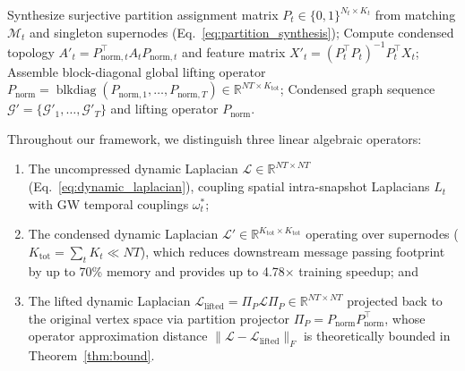 \documentclass[sigconf]{acmart}
\begin{document}
\begin{algorithm}[t]
\begin{algorithmic}[1]
    \STATE Synthesize surjective partition assignment matrix $P_t \in \{0, 1\}^{N_t \times K_t}$ from matching $\mathcal{M}_t$ and singleton supernodes (Eq.~\eqref{eq:partition_synthesis});
    \STATE Compute condensed topology $A'_t = P_{\text{norm}, t}^\top A_t P_{\text{norm}, t}$ and feature matrix $X'_t = (P_t^\top P_t)^{-1} P_t^\top X_t$;
\ENDFOR
\STATE Assemble block-diagonal global lifting operator $P_{\text{norm}} = \operatorname{blkdiag}(P_{\text{norm}, 1}, \dots, P_{\text{norm}, T}) \in \mathbb{R}^{NT \times K_{\text{tot}}}$;
\STATE \RETURN Condensed graph sequence $\mathcal{G}' = \{\mathcal{G}'_1, \dots, \mathcal{G}'_T\}$ and lifting operator $P_{\text{norm}}$.
\end{algorithmic}
\end{algorithm}

Throughout our framework, we distinguish three linear algebraic operators:
\begin{enumerate}
    \item The uncompressed dynamic Laplacian $\mathcal{L} \in \mathbb{R}^{NT \times NT}$ (Eq.~\eqref{eq:dynamic_laplacian}), coupling spatial intra-snapshot Laplacians $L_t$ with GW temporal couplings $\omega_t^*$;
    \item The condensed dynamic Laplacian $\mathcal{L}' \in \mathbb{R}^{K_{\text{tot}} \times K_{\text{tot}}}$ operating over supernodes ($K_{\text{tot}} = \sum_t K_t \ll NT$), which reduces downstream message passing footprint by up to 70\% memory and provides up to 4.78$\times$ training speedup; and
    \item The lifted dynamic Laplacian $\mathcal{L}_{\text{lifted}} = \Pi_P \mathcal{L} \Pi_P \in \mathbb{R}^{NT \times NT}$ projected back to the original vertex space via partition projector $\Pi_P = P_{\text{norm}} P_{\text{norm}}^\top$, whose operator approximation distance $\|\mathcal{L} - \mathcal{L}_{\text{lifted}}\|_F$ is theoretically bounded in Theorem~\ref{thm:bound}.
\end{enumerate}
\end{document}
